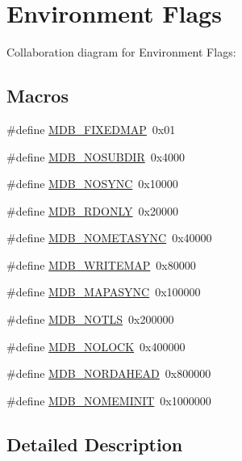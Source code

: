 \hypertarget{group__mdb__env}{}\section{Environment Flags}
\label{group__mdb__env}
Collaboration diagram for Environment Flags\+:
\subsection*{Macros}
\begin{DoxyCompactItemize}
\item 
\#define \mbox{\hyperlink{group__mdb__env_ga492952277c481bc4a6fa08ef71c29487}{M\+D\+B\+\_\+\+F\+I\+X\+E\+D\+M\+AP}}~0x01
\item 
\#define \mbox{\hyperlink{group__mdb__env_gabf0e3e3b1e18df6526969f6825a388ea}{M\+D\+B\+\_\+\+N\+O\+S\+U\+B\+D\+IR}}~0x4000
\item 
\#define \mbox{\hyperlink{group__mdb__env_ga5791dd1adb09123f82dd1f331209e12e}{M\+D\+B\+\_\+\+N\+O\+S\+Y\+NC}}~0x10000
\item 
\#define \mbox{\hyperlink{group__mdb__env_gac4c41c0ae044127b2fc80420c323cac6}{M\+D\+B\+\_\+\+R\+D\+O\+N\+LY}}~0x20000
\item 
\#define \mbox{\hyperlink{group__mdb__env_ga5021c4e96ffe9f383f5b8ab2af8e4b16}{M\+D\+B\+\_\+\+N\+O\+M\+E\+T\+A\+S\+Y\+NC}}~0x40000
\item 
\#define \mbox{\hyperlink{group__mdb__env_ga7b81e9fd5f8fae38786d67e1a8387fa7}{M\+D\+B\+\_\+\+W\+R\+I\+T\+E\+M\+AP}}~0x80000
\item 
\#define \mbox{\hyperlink{group__mdb__env_gab034ed0d8e5938090aef5ee0997f7e94}{M\+D\+B\+\_\+\+M\+A\+P\+A\+S\+Y\+NC}}~0x100000
\item 
\#define \mbox{\hyperlink{group__mdb__env_ga5dca84a576d14b4bfe2deddc2dc622d3}{M\+D\+B\+\_\+\+N\+O\+T\+LS}}~0x200000
\item 
\#define \mbox{\hyperlink{group__mdb__env_ga9b0450b1a87cb9f22e033550e49e5037}{M\+D\+B\+\_\+\+N\+O\+L\+O\+CK}}~0x400000
\item 
\#define \mbox{\hyperlink{group__mdb__env_ga0fcdaf42f0c45749a2dff11ee322303f}{M\+D\+B\+\_\+\+N\+O\+R\+D\+A\+H\+E\+AD}}~0x800000
\item 
\#define \mbox{\hyperlink{group__mdb__env_gafa035a1f17ebf31376eafb7bd2cdd448}{M\+D\+B\+\_\+\+N\+O\+M\+E\+M\+I\+N\+IT}}~0x1000000
\end{DoxyCompactItemize}


\subsection{Detailed Description}


